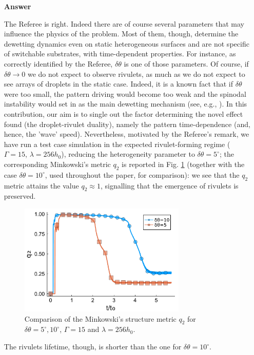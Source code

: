 \documentclass[12pt,english]{article}
\begin{document}
\begin{itemize}
\item[ \textbf{{Answer}}]
{ 
The Referee is right. Indeed there are of course several parameters 
that may influence the physics of the problem. 
Most of them, though, determine the dewetting dynamics even on static heterogeneous surfaces and are not specific of switchable substrates, with time-dependent properties.
For instance, as correctly identified by the Referee, $\delta \theta$ is one of those 
parameters. Of course, if $\delta \theta \rightarrow 0$ we do not expect to observe rivulets, as much as we do not expect to see arrays of droplets in the static case. Indeed, it is a known fact that if $\delta \theta$ were too small, the pattern driving would become too weak and the spinodal instability would set in as the main dewetting mechanism (see, e.g., \cite{KonnurPRL2000}). 
In this contribution, our aim is to single out the factor determining the novel effect found (the droplet-rivulet duality), namely the pattern time-dependence (and, hence, the 'wave' speed).  
Nevertheless, motivated by the Referee's remark, we have run a test case simulation in 
the expected rivulet-forming regime ($\Gamma=15$, $\lambda = 256 h_0$), reducing 
the heterogeneity parameter to $\delta \theta = 5^{\circ}$; 
the corresponding Minkowski's metric $q_2$ is reported 
in Fig. \ref{fig:dif_contrast} (together with the case $\delta \theta =10^{\circ}$, used throughout the 
paper, for comparison): we see that the $q_2$ metric attains the value $q_2 \approx 1$, signalling 
that the emergence of rivulets is preserved.
\begin{figure}
    \centering
    \includegraphics[width=0.75\textwidth]{gamma15_deltaTheta.pdf}
    \caption{Comparison of the Minkowski's structure metric $q_2$ for 
    $\delta\theta = 5^{\circ}, 10^{\circ}$, 
    $\Gamma = 15$ and $\lambda = 256 h_0$.}
    \label{fig:dif_contrast}
\end{figure}
The rivulets lifetime, though, is shorter than the one for $\delta \theta = 10^{\circ}$.
}
\end{itemize}
\end{document}
